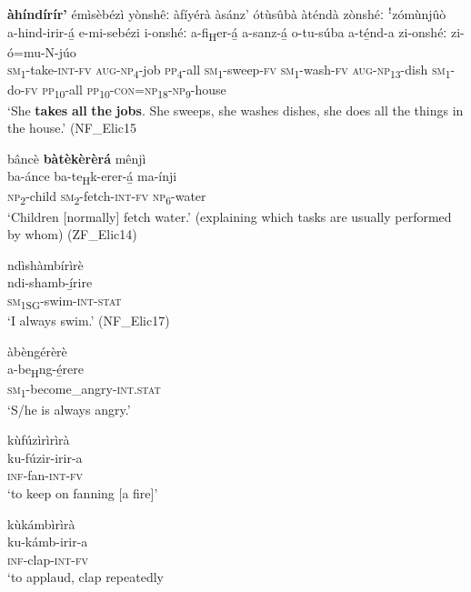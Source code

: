 \ea
\label{bkm:Ref71210902}
\textbf{àhíndírír’} émìsèbézì yònshêː àfíyérà àsánz’ ótùsûbà àténdà zònshéː ꜝzómùnjûò\\
\gll a-hind-irir-á̲    e-mi-sebézi  i-onshéː a-fi\textsubscript{H}er-á̲    a-sanz-á̲  o-tu-súba a-té̲nd-a  zi-onshéː  zi-ó=mu-N-júo\\
\textsc{sm}\textsubscript{1}-take-\textsc{int}-\textsc{fv}  \textsc{aug}-\textsc{np}\textsubscript{4}-job  \textsc{pp}\textsubscript{4}\--all
\textsc{sm}\textsubscript{1}-sweep-\textsc{fv}  \textsc{sm}\textsubscript{1}-wash-\textsc{fv}  \textsc{aug}-\textsc{np}\textsubscript{13}-dish
\textsc{sm}\textsubscript{1}-do-\textsc{fv}  \textsc{pp}\textsubscript{10}-all  \textsc{pp}\textsubscript{10}-\textsc{con}=\textsc{np}\textsubscript{18}-\textsc{np}\textsubscript{9}-house\\
\glt ‘She \textbf{takes} \textbf{all} \textbf{the} \textbf{jobs}. She sweeps, she washes dishes, she does all the things in the house.’ (NF\_Elic15
\z

\ea
\label{bkm:Ref71211104}
bâncè \textbf{bàtèkèrèrá} mênjì\\
\gll ba-ánce  ba-te\textsubscript{H}k-erer-á̲  ma-ínji\\
\textsc{np}\textsubscript{2}-child  \textsc{sm}\textsubscript{2}-fetch-\textsc{int}-\textsc{fv}  \textsc{np}\textsubscript{6}-water\\
\glt ‘Children [normally] fetch water.’ (explaining which tasks are usually performed by whom) (ZF\_Elic14)
\z

\ea
\label{bkm:Ref71210990}
\glll ndìshàmbírìrè\\
ndi-shamb-í̲rire\\
\textsc{sm}\textsubscript{1SG}-swim-\textsc{int}-\textsc{stat}\\
\glt ‘I always swim.’ (NF\_Elic17)
\z

\ea
\label{bkm:Ref71211122}
\glll àbèngérèrè\\
a-be\textsubscript{H}ng-é̲rere\\
\textsc{sm}\textsubscript{1}-become\_angry-\textsc{int}.\textsc{stat}\\
\glt ‘S/he is always angry.’
\z

\ea
\label{bkm:Ref71211136}
\glll kùfúzìrìrìrà\\
ku-fúzir-irir-a\\
\textsc{inf}-fan-\textsc{int}-\textsc{fv}\\
\glt ‘to keep on fanning [a fire]’
\z

\ea
\label{bkm:Ref71211137}
\glll kùkámbìrìrà\\
ku-kámb-irir-a\\
\textsc{inf}-clap-\textsc{int}-\textsc{fv}\\
\glt ‘to applaud, clap repeatedly
\z

